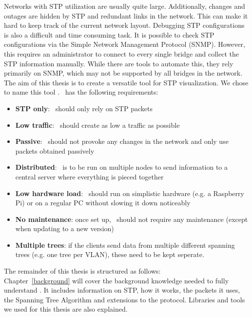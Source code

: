 Networks with STP utilization are usually quite large.
Additionally, changes and outages are hidden by STP and redundant links in the network.
This can make it hard to keep track of the current network layout.
Debugging STP configurations is also a difficult and time consuming task.
It is possible to check STP configurations via the Simple Network Management Protocol (SNMP).
However, this requires an administrator to connect to every single bridge and collect the STP information manually.
While there are tools to automate this, they rely primarily on SNMP, which may not be supported by all bridges in the network.\\

The aim of this thesis is to create a versatile tool for STP visualization.
We chose to name this tool \textit{\tool}.
\tool\ has the following requirements:
\begin{itemize}
    \item \textbf{STP only}: \tool\ should only rely on STP packets
    \item \textbf{Low traffic}: \tool\ should create as low a traffic as possible
    \item \textbf{Passive}: \tool\ should not provoke any changes in the network and only use packets obtained passively
    \item \textbf{Distributed}: \tool\ is to be run on multiple nodes to send information to a central server where everything is pieced together
    \item \textbf{Low hardware load}: \tool\ should run on simplistic hardware (e.g. a Raspberry Pi) or on a regular PC without slowing it down noticeably
    \item \textbf{No maintenance}: once set up, \tool\ should not require any maintenance (except when updating to a new version)
    \item \textbf{Multiple trees}: if the clients send data from multiple different spanning trees (e.g. one tree per VLAN), these need to be kept seperate.
    \label{requirements}
\end{itemize}

The remainder of this thesis is structured as follows:\\
Chapter~\ref{background} will cover the background knowledge needed to fully understand \tool.
It includes information on STP, how it works, the packets it uses, the Spanning Tree Algorithm and extensions to the protocol.
Libraries and tools we used for this thesis are also explained.

